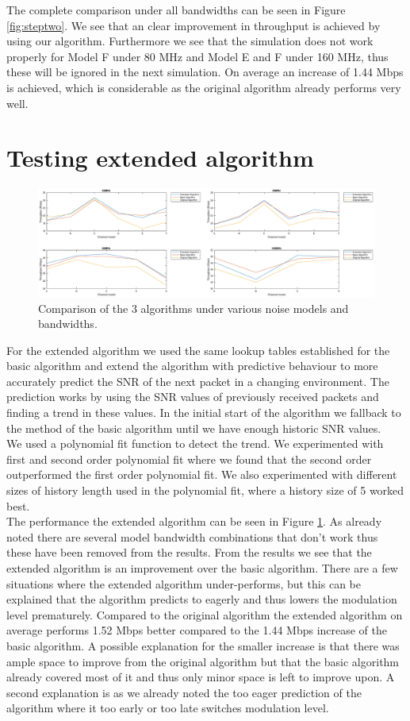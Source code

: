 \documentclass[a4paper]{article}
\begin{document}
The complete comparison under all bandwidths can be seen in Figure \ref{fig:steptwo}. We see that an clear improvement in throughput is achieved by using our algorithm. Furthermore we see that the simulation does not work properly for Model F under 80 MHz and Model E and F under 160 MHz, thus these will be ignored in the next simulation. On average an increase of 1.44 Mbps is achieved, which is considerable as the original algorithm already performs very well.
\clearpage
\section{Testing extended algorithm}
\begin{figure}[h!]
\centering
\includegraphics[scale=.35]{stepthree.eps}
\caption{Comparison of the 3 algorithms under various noise models and bandwidths.}
\label{fig:stepthree}
\end{figure}
For the extended algorithm we used the same lookup tables established for the basic algorithm and extend the algorithm with predictive behaviour to more accurately predict the SNR of the next packet in a changing environment. The prediction works by using the SNR values of previously received packets and finding a trend in these values. In the initial start of the algorithm we fallback to the method of the basic algorithm until we have enough historic SNR values.\\
We used a polynomial fit function to detect the trend. We experimented with first and second order polynomial fit where we found that the second order outperformed the first order polynomial fit. We also experimented with different sizes of history length used in the polynomial fit, where a history size of 5 worked best.\\
The performance the extended algorithm can be seen in Figure \ref{fig:stepthree}. As already noted there are several model bandwidth combinations that don't work thus these have been removed from the results.
From the results we see that the extended algorithm is an improvement over the basic algorithm. There are a few situations where the extended algorithm under-performs, but this can be explained that the algorithm predicts to eagerly and thus lowers the modulation level prematurely. Compared to the original algorithm the extended algorithm on average performs 1.52 Mbps better compared to the 1.44 Mbps increase of the basic algorithm. A possible explanation for the smaller increase is that there was ample space to improve from the original algorithm but that the basic algorithm already covered most of it and thus only minor space is left to improve upon. A second explanation is as we already noted the too eager prediction of the algorithm where it too early or too late switches modulation level. 
\end{document}
